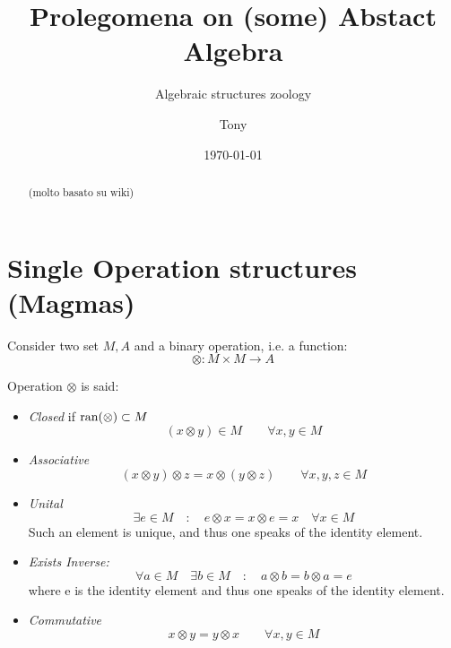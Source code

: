 \documentclass[a4paper,12pt]{scrartcl}    %
\newcommand{\OpA}{\otimes}
\begin{document}
	\title{Prolegomena on (some) Abstact Algebra}
	\subtitle{Algebraic structures zoology}
	\author{Tony}
	\date{\today}
\maketitle

\begin{abstract}
	(molto basato su wiki)

\end{abstract}

\tableofcontents

\newpage

\section{Single Operation structures (Magmas)}
Consider two set $M, A$ and a binary operation, i.e. a function:
\begin{displaymath}
	\OpA : M \times M \rightarrow A
\end{displaymath}

Operation $\OpA$ is said:
\begin{itemize}
\item \emph{Closed} if $\ran(\OpA)\subset M$
	\begin{equation}\label{Closure}
		( x \OpA y ) \in M \qquad \forall x,y\in M
	\end{equation}
\item \emph{Associative}
	\begin{equation}\label{Associativity}
		(x \OpA y) \OpA z = x \OpA (y \OpA z) \qquad \forall x,y,z \in M
	\end{equation}
\item \emph{Unital}
	\begin{equation}\label{ExistsUnit}
		\exists e \in M \quad : \quad e \OpA x = x \OpA e = x \quad \forall x \in M
	\end{equation}
	Such an element is unique, and thus one speaks of the identity element.
\item \emph{Exists Inverse:}
	\begin{equation}\label{ExistsInverse}
		\forall a \in M \quad \exists b \in M \quad : \quad a \OpA b = b \OpA a = e
	\end{equation}
	where e is the identity element and thus one speaks of the identity element.
\item \emph{Commutative}
	\begin{equation}\label{Commutativity}
		x \OpA y = y \OpA x \qquad \forall x,y\in M
	\end{equation}
\end{itemize}
\end{document}
